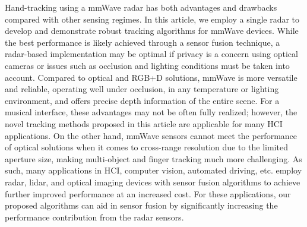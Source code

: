 \documentclass[10pt,journal,final]{IEEEtran}
\begin{document}

Hand-tracking using a mmWave radar has both advantages and drawbacks compared with other sensing regimes.
In this article, we employ a single radar to develop and demonstrate robust tracking algorithms for mmWave devices.
While the best performance is likely achieved through a sensor fusion technique, a radar-based implementation may be optimal if privacy is a concern using optical cameras or issues such as occlusion and lighting conditions must be taken into account.
Compared to optical and RGB+D solutions, mmWave is more versatile and reliable, operating well under occlusion, in any temperature or lighting environment, and offers precise depth information of the entire scene.
For a musical interface, these advantages may not be often fully realized; however, the novel tracking methods proposed in this article are applicable for many HCI applications.
On the other hand, mmWave sensors cannot meet the performance of optical solutions when it comes to cross-range resolution due to the limited aperture size, making multi-object and finger tracking much more challenging. 
As such, many applications in HCI, computer vision, automated driving, etc. employ radar, lidar, and optical imaging devices with sensor fusion algorithms to achieve further improved performance at an increased cost. 
For these applications, our proposed algorithms can aid in sensor fusion by significantly increasing the performance contribution from the radar sensors.
\end{document}
